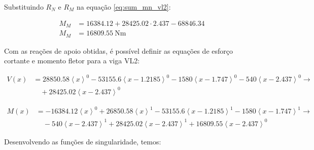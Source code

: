Substituindo $R_N$ e $R_M$ na equação \eqref{eq:sum_mn_vl2}:

\begin{align*}
  M_M & = \num{16384.12} + \num{28425.02} \cdot \num{2.437} - \num{68846.34} \\
  M_M & = \boxed{\SI{16809.55}{\newton\meter}}
\end{align*}

Com as reações de apoio obtidas, é possível definir as equações de esforço cortante e momento fletor para a viga VL2:

\begin{align*}
  V(x) & = \num{28850.58} \left<x\right>^0 - \num{53155.6} \left<x - \num{1.2185}\right>^0 - \num{1580} \left<x - \num{1.747}\right>^0 - \num{540} \left<x - \num{2.437}\right>^0  \rightarrow \\
       & \quad + \num{28425.02} \left<x - \num{2.437}\right>^0
\end{align*}

\begin{align*}
  M(x) & = -\num{16384.12} \left<x\right>^0 + \num{26850.58} \left<x\right>^1 - \num{53155.6} \left<x - \num{1.2185}\right>^1 - \num{1580} \left<x - \num{1.747}\right>^1 \rightarrow \\
       & \quad - \num{540} \left<x - \num{2.437}\right>^1  + \num{28425.02} \left<x - \num{2.437}\right>^1 + \num{16809.55} \left<x - \num{2.437}\right>^0
\end{align*}

Desenvolvendo as funções de singularidade, temos:



